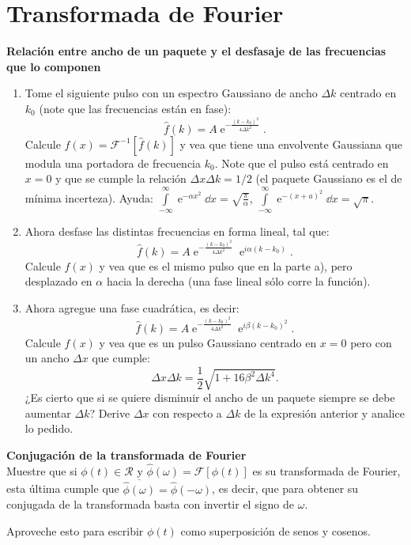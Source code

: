 \section*{Transformada de Fourier}

\item 
\textbf{Relación entre ancho de un paquete y el desfasaje de las frecuencias que lo componen}
\begin{enumerate}
	\item Tome el siguiente pulso con un espectro Gaussiano de ancho $\Delta k$ centrado en $k_0$ (note que las frecuencias están en fase):
$$
\hat{f}(k)=A \operatorname{e}^{-\frac{ ( k - k_0 )^2 }{ 4 \Delta k^2 } }.
$$
Calcule $f(x) = \mathcal{F}^{-1}[\hat{f}(k)]$ y vea que tiene una envolvente Gaussiana que modula una portadora de frecuencia $k_{0}$.
Note que el pulso está centrado en $x=0$ y que se cumple la relación $\Delta x \Delta k = 1/2$ (el paquete Gaussiano es el de mínima incerteza).
Ayuda: \( \int\limits_{-\infty}^{\infty} \operatorname{e}^{-\alpha x^2} \dd{x} = \sqrt{\frac{\pi}{\alpha} } \), \( \int\limits_{-\infty}^{\infty} \operatorname{e}^{-(x+ a)^2} \dd{x} = \sqrt{\pi}\).
	\item Ahora desfase las distintas frecuencias en forma lineal, tal que:
$$
\hat{f}(k)=A \operatorname{e}^{ -\frac{ ( k - k_0 )^2 }{ 4 \Delta k^2 } } \operatorname{e}^{ i \alpha (k - k_0 ) }.
$$
Calcule $f(x)$ y vea que es el mismo pulso que en la parte a), pero desplazado en $\alpha$ hacia la derecha (una fase lineal sólo corre la función).
	\item Ahora agregue una fase cuadrática, es decir:
$$
\hat{f}(k) = A \operatorname{e}^{-\frac{(k-k_{0})^{2}}{4\Delta k^{2}} } \operatorname{e}^{i \beta ( k - k_0 )^2 }.
$$
Calcule $f(x)$ y vea que es un pulso Gaussiano centrado en $x=0$ pero con un ancho $\Delta x$ que cumple:
$$
\Delta x \Delta k = \frac{1}{2} \sqrt{ 1 + 16 \beta^2 \Delta k^4 }.
$$
¿Es cierto que si se quiere disminuir el ancho de un paquete siempre se debe aumentar $\Delta k$?
Derive $\Delta x$ con respecto a $\Delta k$ de la expresión anterior y analice lo pedido.
\end{enumerate}



\item \textbf{Conjugación de la transformada de Fourier}\\
Muestre que si $\phi(t) \in \mathcal{R}$ y $\hat{\phi }(\omega)= \mathcal{F} \left[ \phi (t) \right]$ es su transformada de Fourier, esta última cumple que \( \overline{\hat{\phi } (\omega) } = \hat{\phi }(- \omega) \), es decir, que para obtener su conjugada de la transformada basta con invertir el signo de $\omega$.

Aproveche esto para escribir $\phi(t)$ como superposición de senos y cosenos.
